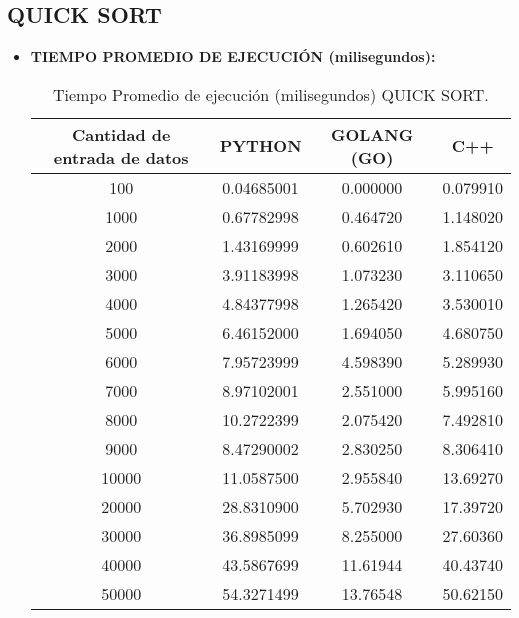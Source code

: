 \documentclass{article}
\begin{document}
\subsection{QUICK SORT}
    \begin{itemize}
      \item \textbf{TIEMPO PROMEDIO DE EJECUCIÓN (milisegundos):}
        \begin{table}[H]
            \centering
            \begin{tabular}{||c c c c||} 
              \hline
              \textbf{Cantidad de entrada de datos} & \textbf{PYTHON} & \textbf{GOLANG (GO)} & \textbf{C++} \\ [0.5ex] 
              \hline\hline
              100    &  0.04685001  &  0.000000  &  0.079910  \\ [0.5ex]
              1000   &  0.67782998  &  0.464720  &  1.148020  \\ [0.5ex]
              2000   &  1.43169999  &  0.602610  &  1.854120  \\ [0.5ex]
              3000   &  3.91183998  &  1.073230  &  3.110650  \\ [0.5ex]
              4000   &  4.84377998  &  1.265420  &  3.530010  \\ [0.5ex]
              5000   &  6.46152000  &  1.694050  &  4.680750  \\ [0.5ex]
              6000   &  7.95723999  &  4.598390  &  5.289930  \\ [0.5ex]
              7000   &  8.97102001  &  2.551000  &  5.995160  \\ [0.5ex]
              8000   &  10.2722399  &  2.075420  &  7.492810  \\ [0.5ex]
              9000   &  8.47290002  &  2.830250  &  8.306410  \\ [0.5ex]
              10000  &  11.0587500  &  2.955840  &  13.69270  \\ [0.5ex]
              20000  &  28.8310900  &  5.702930  &  17.39720  \\ [0.5ex]
              30000  &  36.8985099  &  8.255000  &  27.60360  \\ [0.5ex]
              40000  &  43.5867699  &  11.61944  &  40.43740  \\ [0.5ex]
              50000  &  54.3271499  &  13.76548  &  50.62150  \\ [0.5ex]
              \hline
            \end{tabular}
            \caption{Tiempo Promedio de ejecución (milisegundos) QUICK SORT.}
            \label{table:tiempoPromedioQuickSort}
        \end{table}


\end{itemize}
\end{document}
